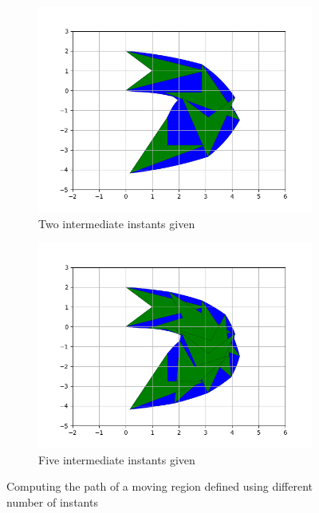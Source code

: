 \begin{figure}[h!]
\begin{subfigure}{.475\textwidth}
  \includegraphics[width=\textwidth]{images/path_some_instants.png}
  \caption{Two intermediate instants given}
  \label{fig:some_insts_path}
\end{subfigure}
\hfill
\begin{subfigure}{.475\textwidth}
  \centering
  \includegraphics[width=\textwidth]{images/path_all_instants.png}
  \caption{Five intermediate instants given}
  \label{fig:all_insts_path}
\end{subfigure}
\caption[Computing the path of a moving region]{Computing the path of a moving region defined using different number of instants}
\label{fig:num_instants_importance}
\end{figure}


